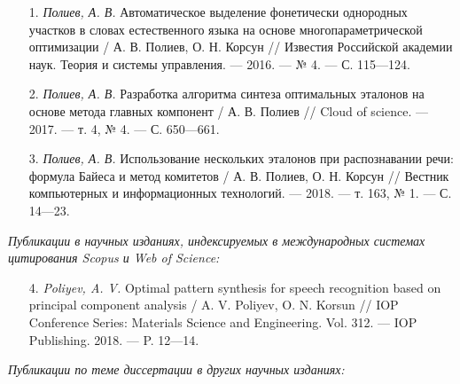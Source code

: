 \begin{enumerate}[wide, labelindent=0pt, leftmargin=*]
	\item[1.] \label{korsun2016automatic} \textit{Полиев, А. В.} Автоматическое выделение фонетически однородных участков в словах естественного языка на основе многопараметрической оптимизации / А. В. Полиев, О. Н. Корсун // Известия Российской академии наук. Теория и системы управления. — 2016. — № 4. — С. 115—124.
	\item[2.] \label{poliyev2017pca} \textit{Полиев, А. В.} Разработка алгоритма синтеза оптимальных эталонов на основе метода главных компонент / А. В. Полиев // Cloud of science. — 2017. — т. 4, № 4. — С. 650—661.
	\item[3.] \label{korsun2018usage} \textit{Полиев, А. В.} Использование нескольких эталонов при распознавании речи: формула Байеса и метод комитетов / А. В. Полиев, О. Н. Корсун // Вестник компьютерных и информационных технологий. — 2018. — т. 163, № 1. — С. 14—23.
\end{enumerate}

\bigskip
\noindent
\textit{Публикации в научных изданиях, индексируемых в международных системах цитирования Scopus и Web of Science:}
\medskip

\begin{enumerate}[wide, labelindent=0pt, leftmargin=*]
	\item[4.] \label{korsun2018optimal} \textit{Poliyev, A. V.} Optimal pattern synthesis for speech recognition based on principal component analysis / A. V. Poliyev, O. N. Korsun // IOP Conference Series: Materials Science and Engineering. Vol. 312. — IOP Publishing. 2018. — P. 12—14.
\end{enumerate}

\bigskip
\noindent
\textit{Публикации по теме диссертации в других научных изданиях:}
\medskip

